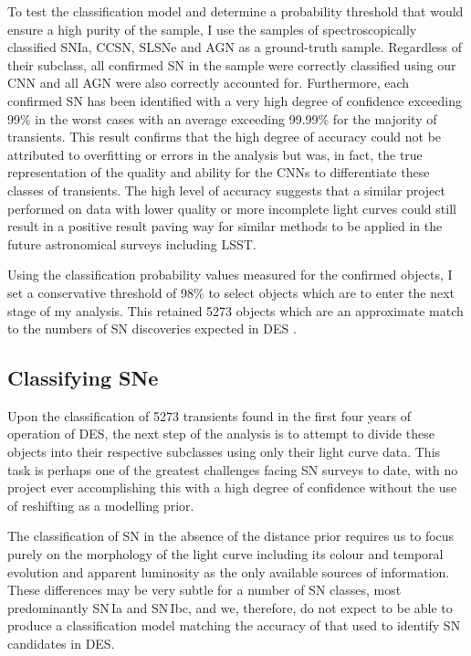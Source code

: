 To test the classification model and determine a probability threshold that would ensure a high purity of the sample, I use the samples of spectroscopically classified SNIa, CCSN, SLSNe and AGN as a ground-truth sample. Regardless of their subclass, all confirmed SN in the sample were correctly classified using our CNN and all AGN were also correctly accounted for. Furthermore, each confirmed SN has been identified with a very high degree of confidence exceeding 99\% in the worst cases with an average exceeding 99.99\% for the majority of transients. This result confirms that the high degree of accuracy could not be attributed to overfitting or errors in the analysis but was, in fact, the true representation of the quality and ability for the CNNs to differentiate these classes of transients. The high level of accuracy suggests that a similar project performed on data with lower quality or more incomplete light curves could still result in a positive result paving way for similar methods to be applied in the future astronomical surveys including LSST.

Using the classification probability values measured for the confirmed objects, I set a conservative threshold of 98\% to select objects which are to enter the next stage of my analysis. This retained 5273 objects which are an approximate match to the numbers of SN discoveries expected in DES \citep{Bernstein2012}.

\subsection{Classifying SNe}
Upon the classification of 5273 transients found in the first four years of operation of DES, the next step of the analysis is to attempt to divide these objects into their respective subclasses using only their light curve data. This task is perhaps one of the greatest challenges facing SN surveys to date, with no project ever accomplishing this with a high degree of confidence without the use of reshifting as a modelling prior.

The classification of SN in the absence of the distance prior requires us to focus purely on the morphology of the light curve including its colour and temporal evolution and apparent luminosity as the only available sources of information. These differences may be very subtle for a number of SN classes, most predominantly SN\,Ia and SN\,Ibc, and we, therefore, do not expect to be able to produce a classification model matching the accuracy of that used to identify SN candidates in DES.


